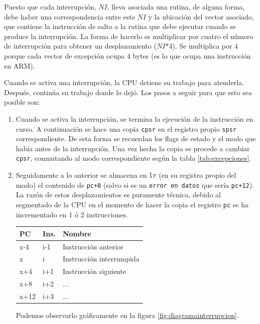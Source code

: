 Puesto que cada interrupción, $NI$, lleva asociada una rutina, de
alguna forma, debe haber una correspondencia entre este $NI$
y la ubicación del vector asociado, que contiene la instrucción de salto a la rutina que debe
ejecutar cuando se produce la interrupción. La forma de hacerlo es multiplicar por
cuatro el número de interrupción para obtener un desplazamiento
($NI$*4). Se multiplica por 4 porque cada vector de excepción
ocupa 4 bytes (es lo que ocupa una instrucción en ARM).

Cuando se activa una interrupción, la CPU detiene su trabajo para
atenderla. Después, continúa su trabajo donde lo dejó. Los pasos a
seguir para que esto sea posible son:

\begin{enumerate}
  \item Cuando se activa la interrupción, se termina la ejecución de la
    instrucción en curso. A continuación se hace una copia {\tt cpsr} en el registro
    propio {\tt spsr} correspondiente. De esta forma se recuerdan los flags de estado
    y el modo que había antes de la interrupción. Una vez hecha la copia se
    procede a cambiar {\tt cpsr}, conmutando al modo correspondiente
    según la tabla \ref{tab:excepciones}.

  \item Seguidamente a lo anterior se almacena en {\tt lr} (en su registro propio del modo)
    el contenido de {\tt pc+8} (salvo si es un {\tt error en datos} que sería
    {\tt pc+12}). La razón de estos
    desplazamientos es puramente técnica, debido al segmentado de la CPU en
    el momento de hacer la copia el registro {\tt pc} se ha incrementado en 1 ó
    2 instrucciones.

\begin{longtable}{ p{1.8cm} | p{2cm} | p{5cm} }
\hline
{\bf PC} & {\bf Ins.} & {\bf Nombre} \\ \hline
x-4  & i-1 & Instrucción anterior \\ \hline
x & i & Instrucción interrumpida \\ \hline
x+4 & i+1 & Instrucción siguiente \\ \hline
x+8 & i+2 & ...     \\ \hline
x+12 & i+3 & ... \\ \hline
\end{longtable}

\newpage
Podemos observarlo gráficamente en la figura \ref{fig:diagramainterrupcion}.


\end{enumerate}
